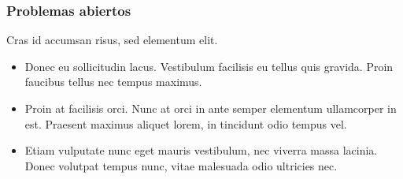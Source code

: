 \documentclass[t, 10pt, mathserif]{beamer}
\begin{document}
\begin{frame}
  \frametitle{Problemas abiertos}

  Cras id accumsan risus, sed elementum elit.
  \pause

  \begin{itemize}
    \item Donec eu sollicitudin lacus. Vestibulum facilisis eu tellus quis gravida. Proin faucibus tellus nec tempus maximus.
    \pause
    
    \item Proin at facilisis orci. Nunc at orci in ante semper elementum ullamcorper in est. Praesent maximus aliquet lorem, in tincidunt odio tempus vel.
    \pause

    \item Etiam vulputate nunc eget mauris vestibulum, nec viverra massa lacinia. Donec volutpat tempus nunc, vitae malesuada odio ultricies nec. 
  \end{itemize}
\end{frame}

\setcounter{finalframe}{\value{framenumber}}

\addtocounter{framenumber}{-1}







\end{document}
